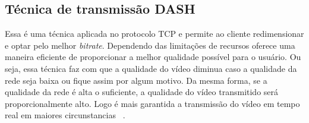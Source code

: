\documentclass[12pt]{article}
\begin{document}
\subsection{Técnica de transmissão DASH}
	Essa é uma técnica aplicada no protocolo TCP e permite ao cliente redimensionar e optar pelo melhor \textit{bitrate}. Dependendo das limitações de recursos oferece uma maneira eficiente de proporcionar a melhor qualidade possível para o usuário. Ou seja, essa técnica faz com que a qualidade do vídeo diminua caso a qualidade da rede seja baixa ou fique assim por algum motivo. Da mesma forma, se a qualidade da rede é alta o suficiente, a qualidade do vídeo transmitido será proporcionalmente alto. Logo é mais garantida a transmissão do vídeo em tempo real em maiores circunstancias~\cite{5} .  
   
  
\end{document}
